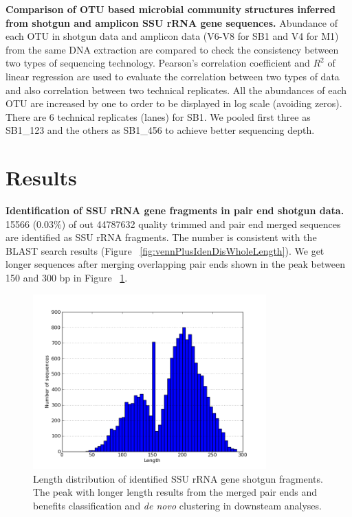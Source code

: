 \documentclass[12pt]{article}
\begin{document}
  {\bf Comparison of OTU based microbial community structures inferred from shotgun and amplicon SSU rRNA gene sequences. }
Abundance of each OTU in shotgun data and amplicon data (V6-V8 for SB1 and V4 for M1) from the same DNA extraction are compared to check the consistency between two types of sequencing technology. Pearson’s correlation coefficient and $R^2$ of linear regression are used to evaluate the correlation between two types of data and also correlation between two technical replicates. All the abundances of each OTU are increased by one to order to be displayed in log scale (avoiding zeros). There are 6 technical replicates (lanes) for SB1. We pooled first three as SB1\_123 and the others as SB1\_456 to achieve better sequencing depth.

\section{Results}
  {\bf Identification of SSU rRNA gene fragments in pair end shotgun data. }
  15566  (0.03\%) of out 44787632 quality trimmed and pair end merged sequences are identified as SSU rRNA fragments. The number is consistent with the BLAST search results (Figure ~\ref{fig:vennPlusIdenDisWholeLength}). We get longer sequences after merging overlapping pair ends shown in the peak between 150 and 300 bp in Figure ~\ref{fig:read_length_dist}.

    \begin{figure}[tbph!]
    \centering
    \includegraphics[width=0.8\textwidth]{figs/read_length_dist.png}
    \caption[Length distribution of identified SSU rRNA gene shotgun fragments]{Length distribution of identified SSU rRNA gene shotgun fragments. The peak with longer length results from the merged pair ends and benefits classification and {\em de novo} clustering in downsteam analyses.}
    \label{fig:read_length_dist}
    \end{figure}
\end{document}
